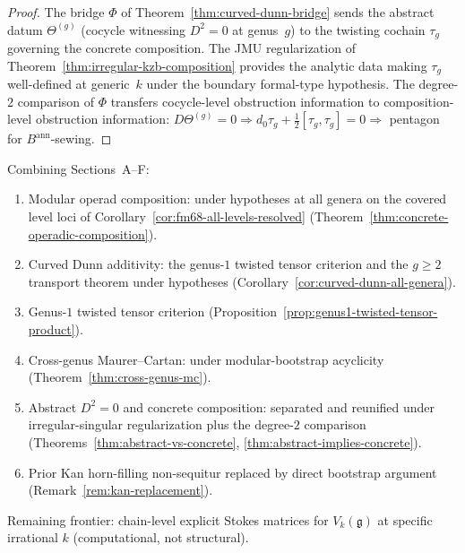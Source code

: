 \begin{proof}
The bridge $\Phi$ of Theorem~\ref{thm:curved-dunn-bridge} sends
the abstract datum $\Theta^{(g)}$ (cocycle witnessing $D^2 = 0$
at genus~$g$) to the twisting cochain $\tau_g$ governing the
concrete composition. The JMU regularization of
Theorem~\ref{thm:irregular-kzb-composition} provides the
analytic data making $\tau_g$ well-defined at generic~$k$ under the
boundary formal-type hypothesis. The degree-\(2\) comparison of
\(\Phi\) transfers cocycle-level obstruction information to
composition-level obstruction information:
$D\Theta^{(g)} = 0 \Rightarrow d_0\tau_g +
\tfrac{1}{2}[\tau_g, \tau_g] = 0 \Rightarrow$ pentagon for
$B^{\mathrm{ann}}$-sewing.
\end{proof}

\begin{remark}
\label{rem:modular-infrastructure-summary}
Combining Sections~A--F:
\begin{enumerate}
\item Modular operad composition: under hypotheses at all genera on the covered
 level loci of Corollary~\ref{cor:fm68-all-levels-resolved}
 (Theorem~\ref{thm:concrete-operadic-composition}).
\item Curved Dunn additivity: the genus-\(1\) twisted tensor
 criterion and the \(g\ge2\) transport theorem under hypotheses
 (Corollary~\ref{cor:curved-dunn-all-genera}).
\item Genus-$1$ twisted tensor criterion
 (Proposition~\ref{prop:genus1-twisted-tensor-product}).
\item Cross-genus Maurer--Cartan: under modular-bootstrap
 acyclicity
 (Theorem~\ref{thm:cross-genus-mc}).
\item Abstract $D^2 = 0$ and concrete composition: separated and
 reunified under irregular-singular regularization plus the
 degree-\(2\) comparison
 (Theorems~\ref{thm:abstract-vs-concrete},
 \ref{thm:abstract-implies-concrete}).
\item Prior Kan horn-filling non-sequitur replaced by direct
 bootstrap argument (Remark~\ref{rem:kan-replacement}).
\end{enumerate}
Remaining frontier: chain-level explicit Stokes matrices for
$V_k(\mathfrak{g})$ at specific irrational $k$ (computational, not
structural).
\end{remark}

